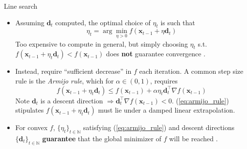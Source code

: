 \documentclass{beamer}
\numberwithin{equation}{section}
\newcommand{\aref}[1]{\alert{\ref{#1}}}
\begin{document}
\begin{frame}{Line search}
    \begin{itemize}
        \item
        Assuming $ \mathbf{d}_t $ computed, the optimal choice of $ \eta_t $
        is such that
        \begin{equation} \label{eq:exact_line_search}
            \eta_t = \arg\min_{\eta > 0}
            f(\mathbf{x}_{t - 1} + \eta\mathbf{d}_t)
        \end{equation}
        Too expensive to compute in general, but simply choosing $ \eta_t $
        s.t. $ f(\mathbf{x}_{t - 1} + \eta_t\mathbf{d}_t) <
        f(\mathbf{x}_{t - 1}) $ does \textbf{not} guarantee convergence
        \cite{nocedal_opt}.

        \item
        Instead, require ``sufficient decrease'' in $ f $ each iteration.
        A common step size rule is the \textit{Armijo rule}, which for
        $ \alpha \in (0, 1) $, requires
        \begin{equation} \label{eq:armijo_rule}
            f(\mathbf{x}_{t - 1} + \eta_t\mathbf{d}_t) \le
            f(\mathbf{x}_{t - 1}) + \alpha\eta_t\mathbf{d}_t^\top
            \nabla f(\mathbf{x}_{t - 1})
        \end{equation}
        Note $ \mathbf{d}_t $ is a descent direction $ \Rightarrow
        \mathbf{d}_t^\top\nabla f(\mathbf{x}_{t - 1}) < 0 $.
        (\aref{eq:armijo_rule}) stipulates $ f(\mathbf{x}_{t - 1} +
        \eta_t\mathbf{d}_t) $ must lie under a damped linear extrapolation.

        \item
        For convex $ f $, $ \{\eta_t\}_{t \in \mathbb{N}} $ satisfying
        (\aref{eq:armijo_rule}) and descent directions
        $ \{\mathbf{d}_t\}_{t \in \mathbb{N}} $ \textbf{guarantee} that the
        global minimizer of $ f $ will be reached \cite{stat_learn_sparsity}.
    \end{itemize}

    \medskip
\end{frame}
\end{document}
